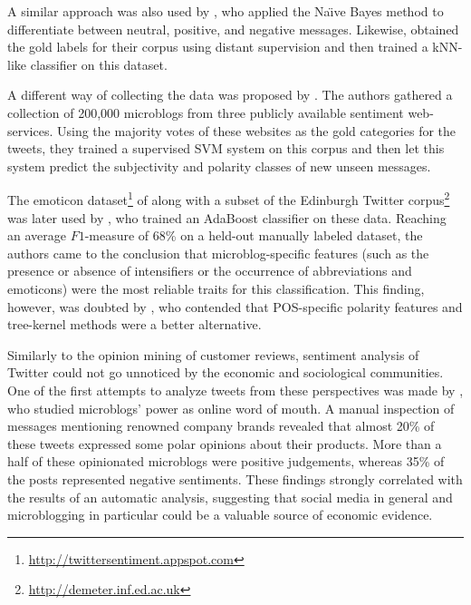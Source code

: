 A similar approach was also used by \citet{Pak:10}, who applied the
Na\"{\i}ve Bayes method to differentiate between neutral, positive,
and negative messages.  Likewise, \citet{Davidov:10} obtained the gold
labels for their corpus using distant supervision and then trained a
kNN-like classifier on this dataset.

A different way of collecting the data was proposed by
\citet{Barbosa:10}.  The authors gathered a collection of 200,000
microblogs from three publicly available sentiment web-services.
Using the majority votes of these websites as the gold categories for
the tweets, they trained a supervised SVM system on this corpus and
then let this system predict the subjectivity and polarity classes of
new unseen messages.

The emoticon
dataset\footnote{\url{http://twittersentiment.appspot.com}} of
\citet{Go:09} along with a subset of the Edinburgh Twitter
corpus\footnote{\url{http://demeter.inf.ed.ac.uk}} was later used by
\citet{Kouloumpis:11}, who trained an AdaBoost classifier on these
data.  Reaching an average $F1$-measure of 68\% on a held-out manually
labeled dataset, the authors came to the conclusion that
microblog-specific features (such as the presence or absence of
intensifiers or the occurrence of abbreviations and emoticons) were
the most reliable traits for this classification.  This finding,
however, was doubted by \citet{Agarwal:11}, who contended that
POS-specific polarity features and tree-kernel methods were a better
alternative.

Similarly to the opinion mining of customer reviews, sentiment
analysis of Twitter could not go unnoticed by the economic and
sociological communities.  One of the first attempts to analyze tweets
from these perspectives was made by \citet{Jansen:09}, who studied
microblogs' power as online word of mouth.  A manual inspection of
messages mentioning renowned company brands revealed that almost 20\%
of these tweets expressed some polar opinions about their products.
More than a half of these opinionated microblogs were positive
judgements, whereas 35\% of the posts represented negative sentiments.
These findings strongly correlated with the results of an automatic
analysis, suggesting that social media in general and microblogging in
particular could be a valuable source of economic evidence.

